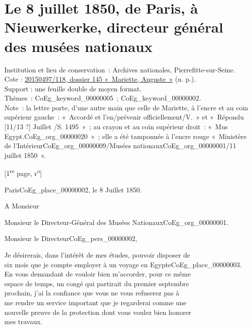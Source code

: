\documentclass{book}
\begin{document}
\section*{Le 8 juillet 1850, de Paris, à Nieuwerkerke, directeur général des musées nationaux}
{\footnotesize
\noindent Institution et lieu de conservation~: Archives nationales, Pierrefitte-sur-Seine.\\
Cote : \hyperlink{CoEg_Mariette_ms_001}{20150497/118, dossier 145 «~Mariette, Auguste~»} (n. p.).\\
Support : une feuille double de moyen format.\\
Thèmes~: \gls{CoEg_keyword_00000005}~; \gls{CoEg_keyword_00000002}.\\
Note~: la lettre porte, d’une autre main que celle de Mariette, à l'encre et au coin supérieur gauche~: «~Accordé et l’en/prévenir officiellement/V.~» et «~Répondu [11/13 ?] Juillet /S. 1495~»~; au crayon et au coin supérieur droit~: «~Mus Egypt.\gls{CoEg_org_00000020}~»~; elle a été tamponnée à l’encre rouge «~Ministère de l’Intérieur\gls{CoEg_org_00000009}/Musées nationaux\gls{CoEg_org_00000001}/11 juillet 1850~».
\begin{center} {[1\textsuperscript{re} page, r\textsuperscript{o}]}\end{center}}
\begin{flushright}
Paris\gls{CoEg_place_00000002}, le 8 Juillet 1850.
\end{flushright}
A Monsieur
\begin{center} Monsieur le Directeur-Général des Musées Nationaux\gls{CoEg_org_00000001}.\end{center}

\hspace{1cm} Monsieur le Directeur\gls{CoEg_pers_00000002},\\

\par Je désirerais, dans l’intérêt de mes études, pouvoir disposer de\\
six mois que je compte employer à un voyage en Egypte\gls{CoEg_place_00000003}.\\
\indent En vous demandant de vouloir bien m’accorder, pour ce même\\
espace de temps, un congé qui partirait du premier septembre\\
prochain, j’ai la confiance que vous ne vous refuserez pas à\\
me rendre un service important que je regarderai comme une\\
nouvelle preuve de la protection dont vous voulez bien honorer\\
mes travaux.\\
\end{document}

